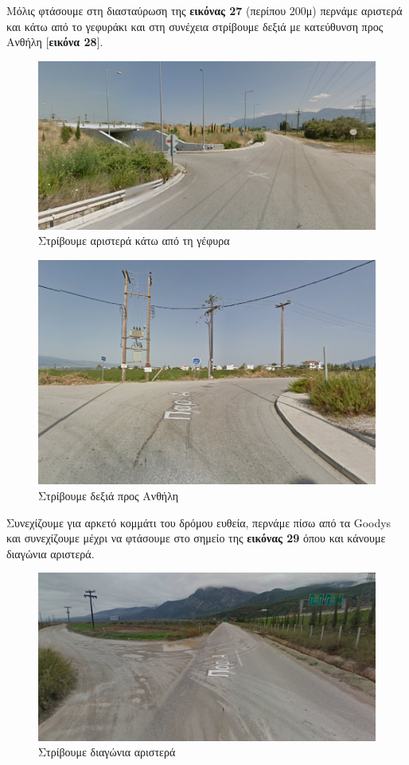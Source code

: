 Μόλις φτάσουμε στη διασταύρωση της \textbf{εικόνας 27} (περίπου 200μ) περνάμε αριστερά και κάτω από το γεφυράκι και στη συνέχεια στρίβουμε δεξιά με κατεύθυνση προς Ανθήλη [\textbf{εικόνα 28}]. 
\begin{figure}[H]
\includegraphics[width=\textwidth]{images/lamia-athina/lamia/lamia_003.jpg}
\caption{Στρίβουμε αριστερά κάτω από τη γέφυρα}
\end{figure}
\begin{figure}[H]  
\includegraphics[width=\textwidth]{images/lamia-athina/lamia/lamia_004.jpg} 
\caption{Στρίβουμε δεξιά προς Ανθήλη} 
\end{figure}

Συνεχίζουμε για αρκετό κομμάτι του δρόμου ευθεία, περνάμε πίσω από τα Goodys και συνεχίζουμε μέχρι να φτάσουμε στο σημείο της \textbf{εικόνας 29} όπου και κάνουμε διαγώνια αριστερά. 
\begin{figure}[H]
\includegraphics[width=\textwidth]{images/lamia-athina/lamia/lamia_005.jpg}
\caption{Στρίβουμε διαγώνια αριστερά} 
\end{figure}

